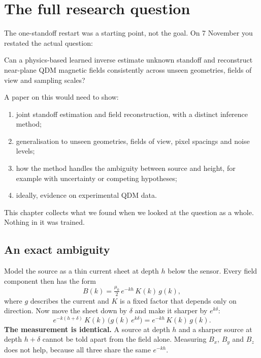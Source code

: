 \chapter{The full research question}\label{ch:question}

The one-standoff restart was a starting point, not the goal. On 7 November you restated the actual question:

\begin{keyidea}
Can a physics-based learned inverse estimate unknown standoff and reconstruct near-plane QDM magnetic fields
consistently across unseen geometries, fields of view and sampling scales?
\end{keyidea}

A paper on this would need to show:
\begin{enumerate}
\item joint standoff estimation and field reconstruction, with a distinct inference method;
\item generalisation to unseen geometries, fields of view, pixel spacings and noise levels;
\item how the method handles the ambiguity between source and height, for example with uncertainty or competing
hypotheses;
\item ideally, evidence on experimental QDM data.
\end{enumerate}

This chapter collects what we found when we looked at the question as a whole. Nothing in it was trained.

\section{An exact ambiguity}

Model the source as a thin current sheet at depth $h$ below the sensor. Every field component then has the form
\begin{equation}
B(k) = \tfrac{\mu_0}{2}\,e^{-kh}\,K(k)\,g(k),
\end{equation}
where $g$ describes the current and $K$ is a fixed factor that depends only on direction. Now move the sheet down by
$\delta$ and make it sharper by $e^{k\delta}$:
\begin{equation}
e^{-k(h+\delta)}\,K(k)\,\big(g(k)\,e^{k\delta}\big) = e^{-kh}\,K(k)\,g(k).
\end{equation}
\textbf{The measurement is identical.} A source at depth $h$ and a sharper source at depth $h+\delta$ cannot be told apart
from the field alone. Measuring $B_x$, $B_y$ and $B_z$ does not help, because all three share the same $e^{-kh}$.

